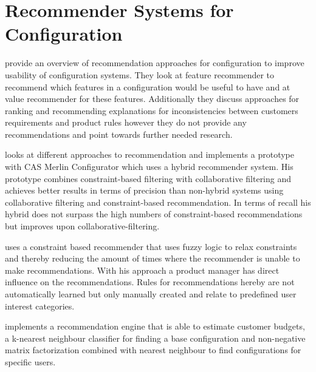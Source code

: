 \section{Recommender Systems for Configuration}
\label{sec:Related_Work:RecommenderSystemsForConfiguration}
\begin{description}[style=unboxed, leftmargin=0cm, font=\normalfont]
    \item[\citeauthor{falknerRecommendationTechnologiesConfigurable2011} \cite{falknerRecommendationTechnologiesConfigurable2011}] provide an overview of recommendation approaches for configuration to improve usability of configuration systems. They look at feature recommender to recommend which features in a configuration would be useful to have and at value recommender for these features. Additionally they discuss approaches for ranking and recommending explanations for inconsistencies between customers requirements and product rules however they do not provide any recommendations and point towards further needed research.
      
    \item[\citeauthor{rubinshteynEntwicklungHybridenRecommender2018} \cite{rubinshteynEntwicklungHybridenRecommender2018}] looks at different approaches to recommendation and implements a prototype with CAS Merlin Configurator which uses a hybrid recommender system. His prototype combines constraint-based filtering with collaborative filtering and achieves better results in terms of precision than non-hybrid systems using collaborative filtering and constraint-based recommendation. In terms of recall his hybrid does not surpass the high numbers of constraint-based recommendations but improves upon collaborative-filtering. 

    \item [\citeauthor{benzMoeglichkeitenIntelligenterEmpfehlungssysteme2017} \cite{benzMoeglichkeitenIntelligenterEmpfehlungssysteme2017}] uses a constraint based recommender that uses fuzzy logic to relax constraints and thereby reducing the amount of times where the recommender is unable to make recommendations. With his approach a product manager has direct influence on the recommendations. Rules for recommendations hereby are not automatically learned but only manually created and relate to predefined user interest categories.

    \item [\citeauthor{ullmannEntwurfUndUmsetzung2017} \cite{ullmannEntwurfUndUmsetzung2017}] implements a recommendation engine that is able to estimate customer budgets, a k-nearest neighbour classifier for finding a base configuration and non-negative matrix factorization combined with nearest neighbour to find configurations for specific users. \par


\end{description}
